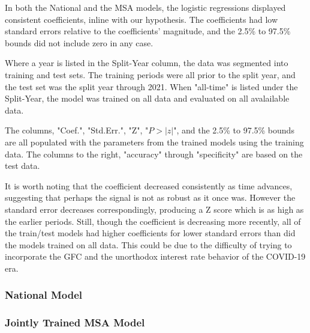 In both the National and the MSA models, the logistic regressions displayed consistent coefficients, inline with our hypothesis. The coefficients had low standard errors relative  to the coefficients' magnitude, and the 2.5\% to 97.5\% bounds did not include zero in any case. 

Where a year is listed in the Split-Year column, the data was segmented into training and test sets. The training periods were all prior to the split year, and the test set was the split year through 2021. When "all-time" is listed under the Split-Year, the model was trained on all data and evaluated on all avalailable data. 

The columns, "Coef.", "Std.Err.", "Z", "$P>|z|$", and the 2.5\% to 97.5\% bounds are all populated with the parameters from the trained models using the training data. The columns to the right, "accuracy" through "specificity" are based on the test data. 

It is worth noting that the coefficient decreased consistently as time advances, suggesting that perhaps the signal is not as robust as it once was. However the standard error decreases correspondingly, producing a Z score which is as high as the earlier periods. Still, though the coefficient is decreasing more recently, all of the train/test models had higher coefficients for lower standard errors than did the models trained on all data. This could be due to the difficulty of trying to incorporate the GFC and the unorthodox interest rate behavior of the COVID-19 era. 

\subsubsection{National Model}

\subsubsection{Jointly Trained MSA Model}


